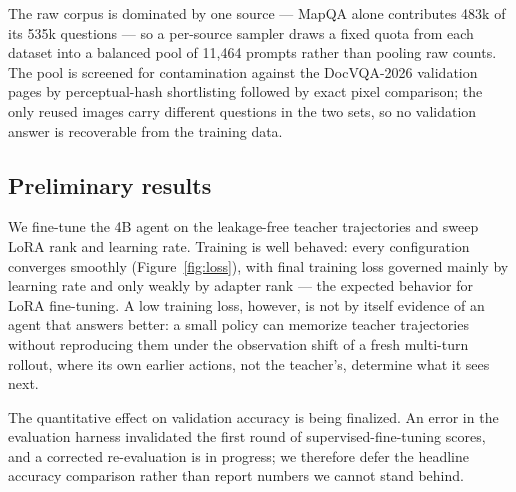 The raw corpus is dominated by one source --- MapQA alone contributes 483k of its 535k questions --- so a per-source sampler draws a fixed quota from each dataset into a balanced pool of 11{,}464 prompts rather than pooling raw counts. The pool is screened for contamination against the DocVQA-2026 validation pages by perceptual-hash shortlisting followed by exact pixel comparison; the only reused images carry different questions in the two sets, so no validation answer is recoverable from the training data.

\subsection{Preliminary results}
\label{sec:prelim}

We fine-tune the 4B agent on the leakage-free teacher trajectories and sweep LoRA rank and learning rate. Training is well behaved: every configuration converges smoothly (Figure~\ref{fig:loss}), with final training loss governed mainly by learning rate and only weakly by adapter rank --- the expected behavior for LoRA fine-tuning. A low training loss, however, is not by itself evidence of an agent that answers better: a small policy can memorize teacher trajectories without reproducing them under the observation shift of a fresh multi-turn rollout, where its own earlier actions, not the teacher's, determine what it sees next.

The quantitative effect on validation accuracy is being finalized. An error in the evaluation harness invalidated the first round of supervised-fine-tuning scores, and a corrected re-evaluation is in progress; we therefore defer the headline accuracy comparison rather than report numbers we cannot stand behind.


